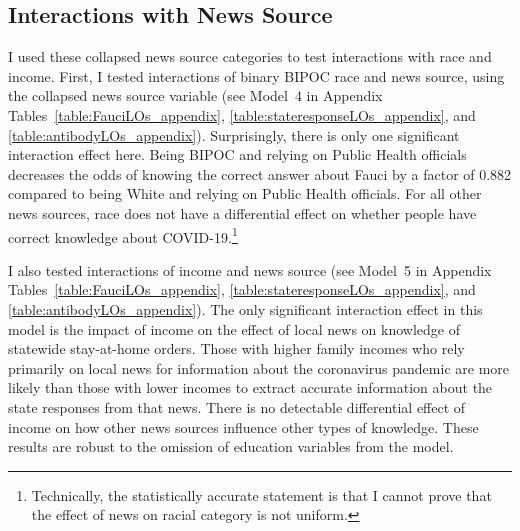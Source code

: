 \documentclass[11pt]{article}
\begin{document}
\subsection{Interactions with News Source}\label{sec:race-news}

I used these collapsed news source categories to test interactions with race and income. First, I tested interactions of binary BIPOC race and news source, using the collapsed news source variable (see Model~4 in Appendix Tables~\ref{table:FauciLOs_appendix}, \ref{table:stateresponseLOs_appendix}, and \ref{table:antibodyLOs_appendix}). Surprisingly, there is only one significant interaction effect here. Being BIPOC and relying on Public Health officials decreases the odds of knowing the correct answer about Fauci by a factor of 0.882 %
compared to being White and relying on Public Health officials. For all other news sources, race does not have a differential effect on whether people have correct knowledge about COVID-19.\footnote
    {Technically, the statistically accurate statement is that I cannot prove that the effect of news on racial category is not uniform.}




I also tested interactions of income and news source (see Model~5 in Appendix Tables~\ref{table:FauciLOs_appendix}, \ref{table:stateresponseLOs_appendix}, and \ref{table:antibodyLOs_appendix}). The only significant interaction effect in this model is the impact of income on the effect of local news on knowledge of statewide stay-at-home orders. Those with higher family incomes who rely primarily on local news for information about the coronavirus pandemic are more likely than those with lower incomes to extract accurate information about the state responses from that news. There is no detectable differential effect of income on how other news sources influence other types of knowledge. These results are robust to the omission of education variables from the model.
\end{document}
